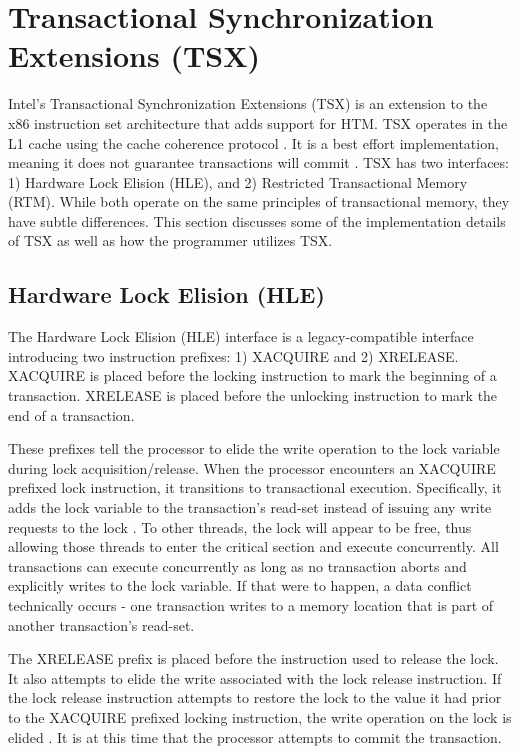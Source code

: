 \documentclass[11pt]{book}
\begin{document}
\section{Transactional Synchronization Extensions (TSX)}

Intel's Transactional Synchronization Extensions (TSX) is an extension to the x86
instruction set architecture that adds support for HTM.  TSX operates in the L1 cache
using the cache coherence protocol \cite{intel_opt_man}.  It is a best effort
implementation, meaning it does not guarantee transactions will commit
\cite{intel_prog_ref}.  TSX has two interfaces: 1) Hardware Lock Elision (HLE), and 2)
Restricted Transactional Memory (RTM).  While both operate on the same principles of
transactional memory, they have subtle differences.  This section discusses some of the
implementation details of TSX as well as how the programmer utilizes TSX.

\subsection{Hardware Lock Elision (HLE)}\label{sec:hle}

The Hardware Lock Elision (HLE) interface is a legacy-compatible interface introducing two
instruction prefixes: 1) XACQUIRE and 2) XRELEASE.  XACQUIRE is placed before the locking
instruction to mark the beginning of a transaction.  XRELEASE is placed before the
unlocking instruction to mark the end of a transaction.

These prefixes tell the processor to elide the write operation to the lock variable during
lock acquisition/release.  When the processor encounters an XACQUIRE prefixed lock
instruction, it transitions to transactional execution.  Specifically, it adds the lock
variable to the transaction's read-set instead of issuing any write requests to the lock
\cite{intel_prog_ref}.  To other threads, the lock will appear to be free, thus allowing
those threads to enter the critical section and execute concurrently.  All transactions
can execute concurrently as long as no transaction aborts and explicitly writes to the
lock variable.  If that were to happen, a data conflict technically occurs - one
transaction writes to a memory location that is part of another transaction's read-set.

The XRELEASE prefix is placed before the instruction used to release the lock.  It also
attempts to elide the write associated with the lock release instruction.  If the lock
release instruction attempts to restore the lock to the value it had prior to the XACQUIRE
prefixed locking instruction, the write operation on the lock is elided
\cite{intel_prog_ref}.  It is at this time that the processor attempts to commit the
transaction.
\end{document}
